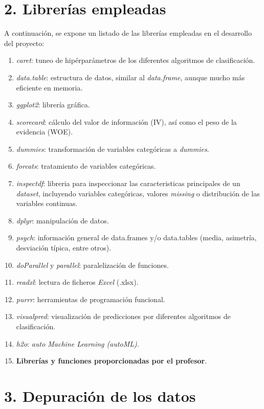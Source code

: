 \documentclass[
]{article}
\begin{document}
\hypertarget{libreruxedas-empleadas}{%
\section{2. Librerías empleadas}\label{libreruxedas-empleadas}}

A continuación, se expone un listado de las librerías empleadas en el
desarrollo del proyecto:

\begin{enumerate}
\def\labelenumi{\arabic{enumi}.}
\item
  \emph{caret}: tuneo de hipérparámetros de los diferentes algoritmos de
  clasificación.
\item
  \emph{data.table}: estructura de datos, similar al \emph{data.frame},
  aunque mucho más eficiente en memoria.
\item
  \emph{ggplot2}: librería gráfica.
\item
  \emph{scorecard}: cálculo del valor de información (IV), así como el
  peso de la evidencia (WOE).
\item
  \emph{dummies}: transformación de variables categóricas a
  \emph{dummies}.
\item
  \emph{forcats}: tratamiento de variables categóricas.
\item
  \emph{inspectdf}: libreria para inspeccionar las caracteristicas
  principales de un \emph{dataset}, incluyendo variables categóricas,
  valores \emph{missing} o distribución de las variables continuas.
\item
  \emph{dplyr}: manipulación de datos.
\item
  \emph{psych}: información general de data.frames y/o data.tables
  (media, asimetría, desviación típica, entre otros).
\item
  \emph{doParallel} y \emph{parallel}: paralelización de funciones.
\item
  \emph{readxl}: lectura de ficheros \emph{Excel} (.xlsx).
\item
  \emph{purrr}: herramientas de programación funcional.
\item
  \emph{visualpred}: visualización de predicciones por diferentes
  algoritmos de clasificación.
\item
  \emph{h2o}: \emph{auto Machine Learning (autoML)}.
\item
  \textbf{Librerías y funciones proporcionadas por el profesor}.
\end{enumerate}

\hypertarget{depuraciuxf3n-de-los-datos}{%
\section{3. Depuración de los datos}\label{depuraciuxf3n-de-los-datos}}
\end{document}
